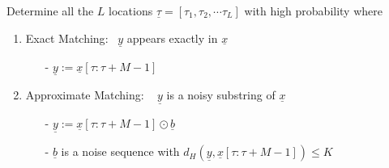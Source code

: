 \documentclass[10pt,xcolor=table]{beamer}
\newcommand{\xv}{\underline{x}}
\newcommand{\bv}{\underline{b}}
\newcommand{\yv}{\underline{y}}
\begin{document}
\begin{frame}
\vspace{-3pt}
\pause
\begin{block}{}
Determine all the {\color{blue} $L$ locations} $\underline{\tau} = [\tau_1, \tau_2, \cdots \tau_L]$ with  {\color{blue}high probability}  where
	\begin{enumerate}
		\item \alert{Exact Matching}:~  $\yv$ appears {\color{blue}exactly} in $\xv$
		\begin{itemize}
				\item [-]  $\yv := \xv[\tau:\tau+M-1]$
		\end{itemize}
        \pause
		\item \alert{Approximate Matching:} ~ $\yv$ is a {\color{blue}noisy substring} of $\xv$
		\begin{itemize}\itemsep3pt
				\item [-] $\yv := \xv[\tau:\tau+M-1] \odot \bv$
				\item [-] $\bv$ is a noise sequence with $d_H(\yv,\xv[\tau:\tau+M-1]) \leq K$
		\end{itemize}
	\end{enumerate}

	\end{block}
	 \end{frame}
\end{document}
